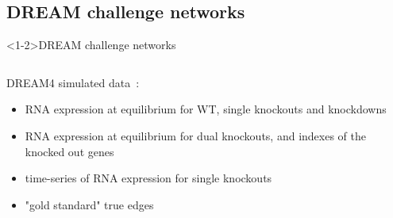 \subsection{DREAM challenge networks}
\begin{frame}<1-2>{DREAM challenge networks}
\label{sec:dream_data}
\begin{columns}
\begin{column}{0.4\textwidth}
DREAM4 simulated data~\cite{dream4}:
\begin{itemize}
    \item RNA expression at equilibrium for WT, single knockouts and knockdowns
    \item RNA expression at equilibrium for dual knockouts, and indexes of the knocked out genes
    \item time-series of RNA expression for single knockouts
    \item "gold standard" true edges
\end{itemize}
\end{column}


\end{columns}
\end{frame}
